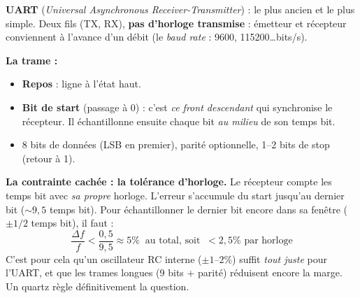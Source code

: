 \documentclass[12pt,a4paper,twoside]{book}
\begin{document}
\begin{formule}
\textbf{UART} (\textit{Universal Asynchronous Receiver-Transmitter}) : le plus ancien et le plus simple. Deux fils (TX, RX), \textbf{pas d'horloge transmise} : émetteur et récepteur conviennent à l'avance d'un débit (le \textit{baud rate} : 9600, 115200\ldots bits/s).

\textbf{La trame :}

\begin{center}
\end{center}

\begin{itemize}[nosep]
\item \textbf{Repos} : ligne à l'état haut.
\item \textbf{Bit de start} (passage à 0) : c'est \textit{ce front descendant} qui synchronise le récepteur. Il échantillonne ensuite chaque bit \textit{au milieu} de son temps bit.
\item 8 bits de données (LSB en premier), parité optionnelle, 1--2 bits de stop (retour à 1).
\end{itemize}
\end{formule}

\begin{attention}
\textbf{La contrainte cachée : la tolérance d'horloge.} Le récepteur compte les temps bit avec \textit{sa propre} horloge. L'erreur s'accumule du start jusqu'au dernier bit ($\sim 9{,}5$ temps bit). Pour échantillonner le dernier bit encore dans sa fenêtre ($\pm 1/2$ temps bit), il faut :
\[
\frac{\Delta f}{f} < \frac{0{,}5}{9{,}5} \approx 5\% \;\;\text{au total, soit} \;\; \boxed{< 2{,}5\% \text{ par horloge}}
\]
C'est pour cela qu'un oscillateur RC interne ($\pm 1$--$2\%$) suffit \textit{tout juste} pour l'UART, et que les trames longues (9 bits + parité) réduisent encore la marge. Un quartz règle définitivement la question.
\end{attention}
\end{document}
